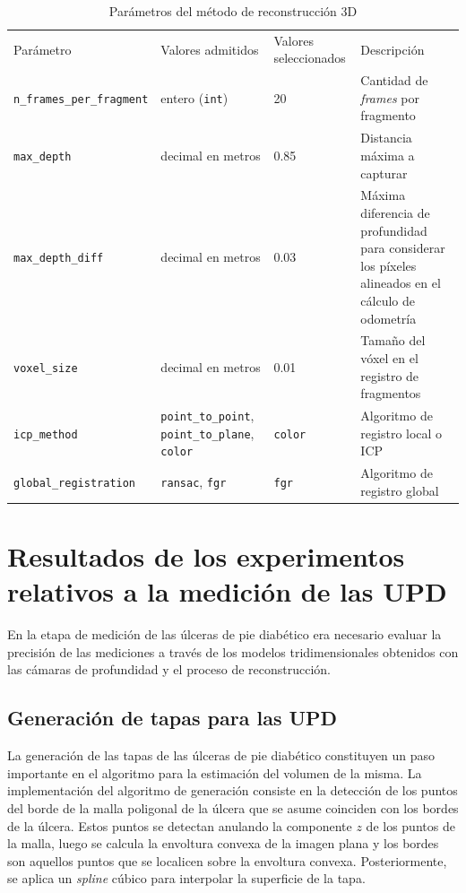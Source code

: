 \begin{table}[ht]
	\centering
	\begin{tabular}{p{4.3cm}p{3cm}p{2.3cm}p{4cm}}
		\hhline{====}
		Parámetro & Valores admitidos & Valores seleccionados & Descripción\\
		\hhline{====}
		\verb|n_frames_per_fragment| & entero (\verb|int|) & 20 & Cantidad de \textit{frames} por fragmento\\ \hline
		\verb|max_depth| & decimal en metros & 0.85 & Distancia máxima a capturar\\ \hline
		\verb|max_depth_diff| & decimal en metros & 0.03 & Máxima diferencia de profundidad para considerar los píxeles alineados en el cálculo de odometría\\ \hline
		\verb|voxel_size| & decimal en metros & 0.01 & Tamaño del vóxel en el registro de fragmentos \\ \hline
		\verb|icp_method| & \verb|point_to_point|, \verb|point_to_plane|, \verb|color| & \verb|color| & Algoritmo de registro local o ICP\\ \hline
		\verb|global_registration| & \verb|ransac|, \verb|fgr| & \verb|fgr| & Algoritmo de registro global \\ \hline
	\end{tabular}
	\caption{Parámetros del método de reconstrucción 3D}
	\label{tab:params}
\end{table}

\section{Resultados de los experimentos relativos a la medición de las UPD}

En la etapa de medición de las úlceras de pie diabético era necesario evaluar la precisión de las mediciones a través de los modelos tridimensionales obtenidos con las cámaras de profundidad y el proceso de reconstrucción. 

\subsection{Generación de tapas para las UPD}

La generación de las tapas de las úlceras de pie diabético constituyen un paso importante en el algoritmo para la estimación del volumen de la misma. La implementación del algoritmo de generación consiste en la detección de los puntos del borde de la malla poligonal de la úlcera que se asume coinciden con los bordes de la úlcera. Estos puntos se detectan anulando la componente $z$ de los puntos de la malla, luego se calcula la envoltura convexa de la imagen plana y los bordes son aquellos puntos que se localicen sobre la envoltura convexa. Posteriormente, se aplica un \textit{spline} cúbico para interpolar la superficie de la tapa.

